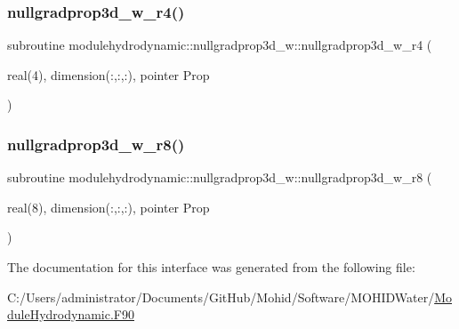 \subsubsection{\texorpdfstring{nullgradprop3d\+\_\+w\+\_\+r4()}{nullgradprop3d\_w\_r4()}}
{\footnotesize\ttfamily subroutine modulehydrodynamic\+::nullgradprop3d\+\_\+w\+::nullgradprop3d\+\_\+w\+\_\+r4 (\begin{DoxyParamCaption}\item[{real(4), dimension(\+:,\+:,\+:), pointer}]{Prop }\end{DoxyParamCaption})\hspace{0.3cm}{\ttfamily [private]}}

\mbox{\label{interfacemodulehydrodynamic_1_1nullgradprop3d__w_a11458bd663d5d4cc24439925f048c565}} 
\subsubsection{\texorpdfstring{nullgradprop3d\+\_\+w\+\_\+r8()}{nullgradprop3d\_w\_r8()}}
{\footnotesize\ttfamily subroutine modulehydrodynamic\+::nullgradprop3d\+\_\+w\+::nullgradprop3d\+\_\+w\+\_\+r8 (\begin{DoxyParamCaption}\item[{real(8), dimension(\+:,\+:,\+:), pointer}]{Prop }\end{DoxyParamCaption})\hspace{0.3cm}{\ttfamily [private]}}



The documentation for this interface was generated from the following file\+:\begin{DoxyCompactItemize}
\item 
C\+:/\+Users/administrator/\+Documents/\+Git\+Hub/\+Mohid/\+Software/\+M\+O\+H\+I\+D\+Water/\mbox{\hyperlink{_module_hydrodynamic_8_f90}{Module\+Hydrodynamic.\+F90}}\end{DoxyCompactItemize}
